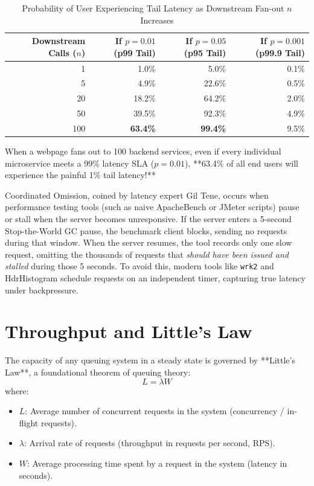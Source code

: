 \begin{table}[htbp]
\centering\small
\begin{tabular}{rrrr}
\toprule
\textbf{Downstream Calls ($n$)} & \textbf{If $p = 0.01$ (p99 Tail)} & \textbf{If $p = 0.05$ (p95 Tail)} & \textbf{If $p = 0.001$ (p99.9 Tail)} \\
\midrule
1 & 1.0\% & 5.0\% & 0.1\% \\
5 & 4.9\% & 22.6\% & 0.5\% \\
20 & 18.2\% & 64.2\% & 2.0\% \\
50 & 39.5\% & 92.3\% & 4.9\% \\
100 & \textbf{63.4\%} & \textbf{99.4\%} & 9.5\% \\
\bottomrule
\end{tabular}
\caption{Probability of User Experiencing Tail Latency as Downstream Fan-out $n$ Increases}
\label{tab:tail-amplification}
\end{table}

When a webpage fans out to 100 backend services, even if every individual microservice meets a 99\% latency SLA ($p = 0.01$), **63.4\% of all end users will experience the painful 1\% tail latency!**

\begin{underthehoodbox}
Coordinated Omission, coined by latency expert Gil Tene, occurs when performance testing tools (such as naive ApacheBench or JMeter scripts) pause or stall when the server becomes unresponsive. If the server enters a 5-second Stop-the-World GC pause, the benchmark client blocks, sending no requests during that window. When the server resumes, the tool records only one slow request, omitting the thousands of requests that \textit{should have been issued and stalled} during those 5 seconds. To avoid this, modern tools like \texttt{wrk2} and HdrHistogram schedule requests on an independent timer, capturing true latency under backpressure.
\end{underthehoodbox}

\section{Throughput and Little's Law}

The capacity of any queuing system in a steady state is governed by **Little's Law**, a foundational theorem of queuing theory:
\begin{equation}
L = \lambda W
\end{equation}
where:
\begin{itemize}[leftmargin=18pt]
  \item $L$: Average number of concurrent requests in the system (concurrency / in-flight requests).
  \item $\lambda$: Arrival rate of requests (throughput in requests per second, RPS).
  \item $W$: Average processing time spent by a request in the system (latency in seconds).
\end{itemize}

